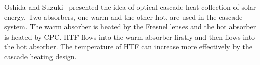 


Oshida and Suzuki~\cite{Oshida1987} presented the idea of optical cascade heat collection of solar energy. Two absorbers, one warm and the other hot, are used in the cascade system. The warm absorber is heated by the Fresnel lenses and the hot absorber is heated by CPC. HTF flows into the warm absorber firstly and then flows into the hot absorber. The temperature of HTF can increase more effectively by the cascade heating design.

